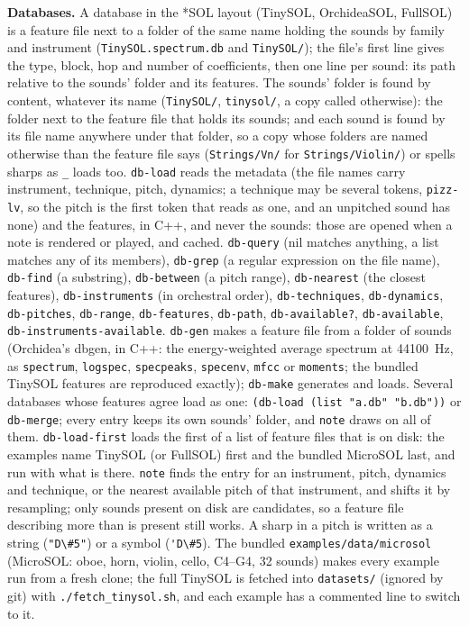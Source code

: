 \documentclass[11pt,a4paper]{article}
\newcommand{\musil}[1]{\lstinline[style=musilinline]{#1}}
\begin{document}
\textbf{Databases.} A database in the *SOL layout (TinySOL, OrchideaSOL, FullSOL) is a
feature file next to a folder of the same name holding the sounds by family and instrument
(\texttt{TinySOL.spectrum.db} and \texttt{TinySOL/}); the file's first line gives the type,
block, hop and number of coefficients, then one line per sound: its path relative to the
sounds' folder and its features. The sounds' folder is found by content, whatever its name
(\texttt{TinySOL/}, \texttt{tinysol/}, a copy called otherwise): the folder next to the
feature file that holds its sounds; and each sound is found by its file name anywhere under
that folder, so a copy whose folders are named otherwise than the feature file says
(\texttt{Strings/Vn/} for \texttt{Strings/Violin/}) or spells sharps as \texttt{\_} loads
too. \musil{db-load} reads the metadata (the
file names carry instrument, technique, pitch, dynamics; a technique may be several tokens,
\texttt{pizz-lv}, so the pitch is the first token that reads as one, and an unpitched sound
has none) and the features, in C++, and never the sounds: those are opened when a note is rendered or played, and cached.
\musil{db-query} (nil matches anything, a list matches any of its members), \musil{db-grep}
(a regular expression on the file name), \musil{db-find} (a substring), \musil{db-between}
(a pitch range), \musil{db-nearest} (the closest features), \musil{db-instruments} (in
orchestral order), \musil{db-techniques}, \musil{db-dynamics}, \musil{db-pitches},
\musil{db-range}, \musil{db-features}, \musil{db-path}, \musil{db-available?},
\musil{db-available}, \musil{db-instruments-available}. \musil{db-gen} makes a feature file
from a folder of sounds (Orchidea's dbgen, in C++: the energy-weighted average spectrum at
44100~Hz, as \texttt{spectrum}, \texttt{logspec}, \texttt{specpeaks}, \texttt{specenv},
\texttt{mfcc} or \texttt{moments}; the bundled TinySOL features are reproduced exactly);
\musil{db-make} generates and loads. Several databases whose features agree load as one:
\musil{(db-load (list "a.db" "b.db"))} or \musil{db-merge}; every entry keeps its own
sounds' folder, and \musil{note} draws on all of them. \musil{db-load-first} loads the first
of a list of feature files that is on disk: the examples name TinySOL (or FullSOL) first and
the bundled MicroSOL last, and run with what is there. \musil{note} finds the entry
for an instrument, pitch, dynamics and technique, or the nearest available pitch of that
instrument, and shifts it by resampling; only sounds present on disk are candidates, so a
feature file describing more than is present still works. A sharp in a pitch is written as
a string (\musil{"D\#5"}) or a symbol (\musil{'D\#5}). The bundled
\texttt{examples/data/microsol} (MicroSOL: oboe, horn, violin, cello, C4--G4, 32 sounds)
makes every example run from a fresh clone; the full TinySOL is fetched into
\texttt{datasets/} (ignored by git) with \texttt{./fetch\_tinysol.sh}, and each example has
a commented line to switch to it.
\end{document}
